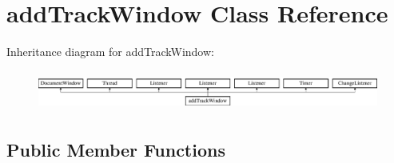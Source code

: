 \hypertarget{classadd_track_window}{}\section{add\+Track\+Window Class Reference}
\label{classadd_track_window}
Inheritance diagram for add\+Track\+Window\+:\begin{figure}[H]
\begin{center}
\leavevmode
\includegraphics[height=1.333333cm]{classadd_track_window}
\end{center}
\end{figure}
\subsection*{Public Member Functions}
